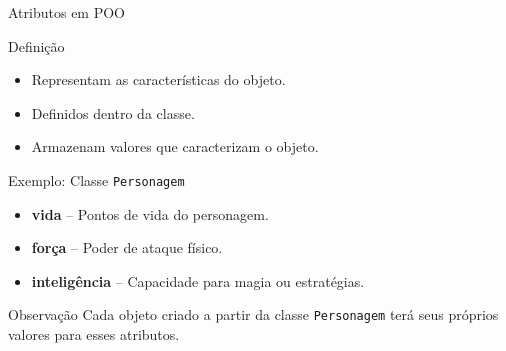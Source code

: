 \begin{frame}{Atributos em POO}

    \begin{block}{Definição}
        \begin{itemize}
            \item Representam as características do objeto.
            \item Definidos dentro da classe.
            \item Armazenam valores que caracterizam o objeto.
        \end{itemize}
    \end{block}

    \begin{exampleblock}{Exemplo: Classe \texttt{Personagem}}
        \begin{itemize}
            \item \textbf{vida} – Pontos de vida do personagem.
            \item \textbf{força} – Poder de ataque físico.
            \item \textbf{inteligência} – Capacidade para magia ou estratégias.
        \end{itemize}
    \end{exampleblock}

    \begin{block}{Observação}
        Cada objeto criado a partir da classe \texttt{Personagem} terá seus próprios valores para esses atributos.
    \end{block}

\end{frame}

